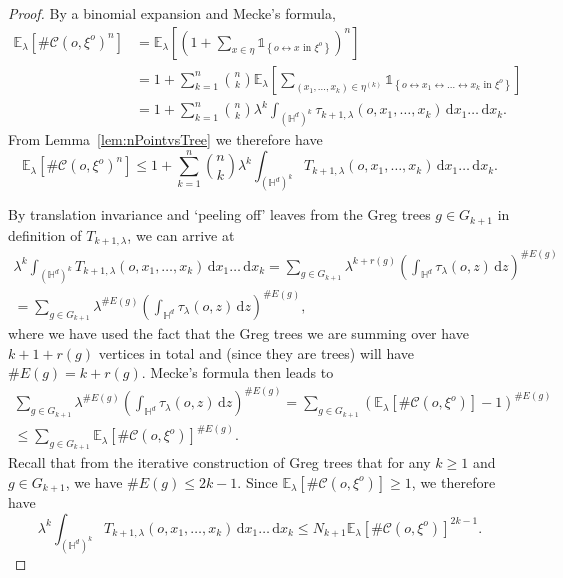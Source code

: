 \documentclass[10pt,a4paper]{amsart}
\newcommand{\C}{\mathscr {C}}
\newcommand{\HypDim}{{\mathbb{H}^d}}
\newcommand{\Id}{\mathds 1}
\newcommand{\conn}[3]{#1 \longleftrightarrow #2\textrm { in } #3}
\newcommand{\dd}{\, \mathrm{d}}
\newcommand{\ela}{\mathbb E_{\lambda}}
\newcommand{\orig}{o}
\newcommand{\tlam}{\tau_\lambda}
\begin{document}
\begin{proof}    
    By a binomial expansion and Mecke's formula,
    \begin{align}
        \ela\left[\#\C\left(\orig,\xi^{\orig}\right)^n\right] &= \ela\left[\left(1+\sum_{x\in\eta}\Id_{\left\{\conn{\orig}{x}{\xi^{\orig}}\right\}}\right)^n\right]\nonumber\\
        &= 1+ \sum_{k=1}^n \binom{n}{k} \ela\left[\sum_{\left(x_1,\ldots,x_k\right)\in\eta^{(k)}}\Id_{\left\{\orig\longleftrightarrow x_1 \longleftrightarrow \ldots \longleftrightarrow x_k \text{ in }\xi^\orig\right\}}\right]\nonumber\\
        &= 1  + \sum^n_{k=1}\binom{n}{k}\lambda^k\int_{\left(\HypDim\right)^k}\tau_{k+1,\lambda}\left(\orig,x_1,\ldots,x_k\right)\dd x_1\ldots \dd x_k.\label{eqn:NMomentEquality}
    \end{align}
From Lemma~\ref{lem:nPointvsTree} we therefore have
\begin{equation}
    \ela\left[\#\C\left(\orig,\xi^{\orig}\right)^n\right] \leq 1  + \sum^n_{k=1}\binom{n}{k}\lambda^k\int_{\left(\HypDim\right)^k}T_{k+1,\lambda}\left(\orig,x_1,\ldots,x_k\right)\dd x_1\ldots \dd x_k.
\end{equation}


By translation invariance and `peeling off' leaves from the Greg trees $g\in G_{k+1}$ in definition of $T_{k+1,\lambda}$, we can arrive at
\begin{multline}
    \lambda^k\int_{\left(\HypDim\right)^k}T_{k+1,\lambda}\left(\orig,x_1,\ldots,x_k\right) \dd x_1\ldots \dd x_k  = \sum_{g\in G_{k+1}}\lambda^{k+r(g)}\left(\int_{\HypDim}\tlam\left(\orig,z\right)\dd z\right)^{\#E(g)}\\
    = \sum_{g\in G_{k+1}}\lambda^{\#E(g)}\left(\int_{\HypDim}\tlam\left(\orig,z\right)\dd z\right)^{\#E(g)},
\end{multline}
where we have used the fact that the Greg trees we are summing over have $k+1+r(g)$ vertices in total and (since they are trees) will have $\# E(g)=k+r(g)$. Mecke's formula then leads to
\begin{multline}
    \sum_{g\in G_{k+1}}\lambda^{\#E(g)}\left(\int_{\HypDim}\tlam\left(\orig,z\right)\dd z\right)^{\#E(g)} = \sum_{g\in G_{k+1}}\left(\ela\left[\#\C\left(\orig,\xi^{\orig}\right)\right]-1\right)^{\#E(g)}\\
    \leq\sum_{g\in G_{k+1}}\ela\left[\#\C\left(\orig,\xi^{\orig}\right)\right]^{\#E(g)}.
\end{multline}
Recall that from the iterative construction of Greg trees that for any $k\geq 1$ and $g\in G_{k+1}$, we have $\# E(g) \leq 2k-1$. Since $\ela\left[\#\C\left(\orig,\xi^{\orig}\right)\right]\geq 1$, we therefore have
\begin{equation}
    \lambda^k\int_{\left(\HypDim\right)^k}T_{k+1,\lambda}\left(\orig,x_1,\ldots,x_k\right) \dd x_1\ldots \dd x_k \leq N_{k+1}\ela\left[\#\C\left(\orig,\xi^{\orig}\right)\right]^{2k-1}.
\end{equation}


\end{proof}
\end{document}
